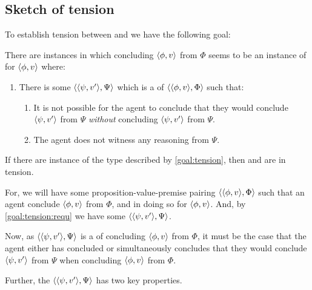 \subsection{Sketch of tension}
\label{sec:overview-tension}

\begin{note}[Goal]
  To establish tension between \ESU{} and \csN{} we have the following goal:

  \begin{goal}
    \label{goal:tension}
    There are instances in which concluding \(\langle \phi, v \rangle\) from \(\Phi\) seems to be an instance of \csN{} for \(\langle \phi, v \rangle\) where:
    \begin{enumerate}[label=\arabic*., ref=\named{G\ref{goal:tension}:\arabic*}]
    \item
      \label{goal:tension:requ}
      There is some \(\langle \langle \psi, v' \rangle, \Psi \rangle\) which is a \requ{} of \(\langle \langle \phi, v \rangle, \Phi \rangle\) such that:
      \begin{enumerate}[label=\alph*., ref=\named{G\ref{goal:tension}:1\alph*}]
      \item
        \label{goal:tension:requ:conclude}
        It is not possible for the agent to conclude that they would conclude \(\langle \psi, v' \rangle\) from \(\Psi\) \emph{without} concluding \(\langle \psi, v' \rangle\) from \(\Psi\).
      \item
        \label{goal:tension:requ:no-reason}
        The agent does not witness any reasoning from \(\Psi\).
      \end{enumerate}
    \end{enumerate}
    \vspace{-\baselineskip}
  \end{goal}

  If there are instance of the type described by \autoref{goal:tension}, then \ESU{} and \csN{} are in tension.

  For, we will have some proposition-value-premise pairing \(\langle \langle \phi, v \rangle, \Phi \rangle\) such that an agent conclude \(\langle \phi, v \rangle\) from \(\Phi\), and in doing so \csV{} for \(\langle \phi, v \rangle\).
  And, by \autoref{goal:tension:requ} we have some \requ{} \(\langle \langle \psi, v' \rangle, \Psi \rangle\).

  Now, as \(\langle \langle \psi, v' \rangle, \Psi \rangle\) is a  of concluding \(\langle \phi, v \rangle\) from \(\Phi\), it must be the case that the agent either has concluded or simultaneously concludes that they would conclude \(\langle \psi, v' \rangle\) from \(\Psi\) when concluding \(\langle \phi, v \rangle\) from \(\Phi\).

  Further, the \requ{} \(\langle \langle \psi, v' \rangle, \Psi \rangle\) has two key properties.


\end{note}
